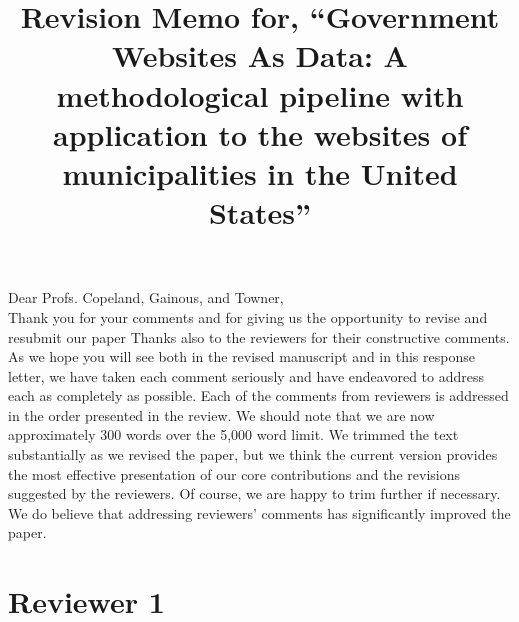 \documentclass[12pt,titlepage]{article}
\title{Revision Memo for, ``Government Websites As Data: A methodological pipeline with application to the websites of municipalities in the United States''}
\begin{document}
\maketitle

Dear Profs. Copeland, Gainous, and Towner,\\

Thank you for your comments and for giving us the opportunity to revise and resubmit our paper Thanks also to the reviewers for their constructive comments. As we hope you will see both in the revised manuscript and in this response letter, we have taken each comment seriously and have endeavored to address each as completely as possible. Each of the comments from reviewers is addressed in the order presented in the review.  We should note that we are now approximately 300 words over the 5,000 word limit. We trimmed the text substantially as we revised the paper, but we think the current version provides the most effective presentation of our core contributions and the revisions suggested by the reviewers. Of course, we are happy to trim further if necessary.  We do believe that addressing reviewers' comments has significantly improved the paper. \\

\section*{Reviewer 1}
\end{document}
